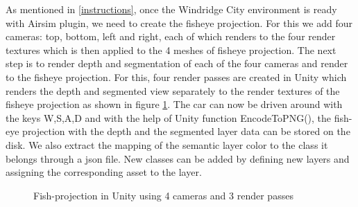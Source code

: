 \documentclass[a4paper, 12pt, oneside, BCOR1cm,toc=chapterentrywithdots]{scrbook}
\begin{document}
As mentioned in \ref{instructions}, once the Windridge City environment is ready with Airsim plugin, we need to create the fisheye projection. For this we add four cameras: top, bottom, left and right, each of which renders to the four render textures which is then applied to the 4 meshes of fisheye projection. The next step is to render depth and  segmentation of each of the four cameras and render to the fisheye projection. For this, four render passes are created in Unity which renders the depth and segmented view separately to the render textures of the fisheye projection as shown in figure \ref{render}. The car can now be driven around with the keys W,S,A,D and with the help of Unity function EncodeToPNG(), the fish-eye projection with the depth and the segmented layer data can be stored on the disk. We also extract the mapping of the semantic layer color to the class it belongs through a json file. New classes can be added by defining new layers and assigning the corresponding asset to the layer.

\begin{figure}[h] 
\caption{Fish-projection in Unity using 4 cameras and 3 render passes} \label{render}
\end{figure}
\end{document}
